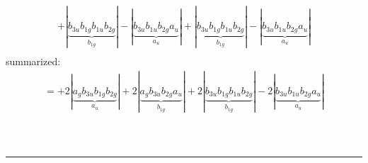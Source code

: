 \documentclass{article}
\begin{document}
\begin{multline*}
+\left|\underbrace{b_{3u} b_{1g} b_{1u} b_{2g}}_{b_{1g}}\right|-\left|\underbrace{b_{3u} b_{1u} b_{2g} a_{u}}_{a_{u}}\right|+\left|\underbrace{b_{3u} b_{1g} b_{1u} b_{2g}}_{b_{1g}}\right|-\left|\underbrace{b_{3u} b_{1u} b_{2g} a_{u}}_{a_{u}}\right|\\
\end{multline*}summarized:\begin{multline*}
=+2\left|\underbrace{a_{g} b_{3u} b_{1g} b_{2g}}_{a_{u}}\right|+2\left|\underbrace{a_{g} b_{3u} b_{2g} a_{u}}_{b_{1g}}\right|+2\left|\underbrace{b_{3u} b_{1g} b_{1u} b_{2g}}_{b_{1g}}\right|-2\left|\underbrace{b_{3u} b_{1u} b_{2g} a_{u}}_{a_{u}}\right|\\
\end{multline*}\\ \\
\hrule\newpage 
\end{document}
